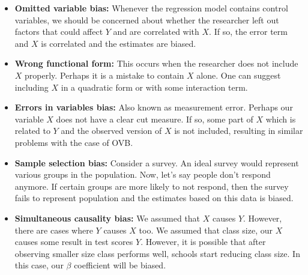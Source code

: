 \documentclass[12pt]{article}
\theoremstyle{definition}
\theoremstyle{property}
\theoremstyle{assumption}
\theoremstyle{example}
\theoremstyle{comment}
\begin{document}
\begin{itemize}
\item \textbf{Omitted variable bias: }Whenever the regression model contains control variables, we should be concerned about whether the researcher left out factors that could affect $Y$ and are correlated with $X$. If so, the error term and $X$ is correlated and the estimates are biased. 
\item \textbf{Wrong functional form: }This occurs when the researcher does not include $X$ properly. Perhaps it is a mistake to contain $X$ alone. One can suggest including $X$ in a quadratic form or with some interaction term.  
\item \textbf{Errors in variables bias: }Also known as measurement error. Perhaps our variable $X$ does not have a clear cut measure. If so, some part of $X$ which is related to $Y$ and the observed version of $X$ is not included, resulting in similar problems with the case of OVB.
\item \textbf{Sample selection bias: }Consider a survey. An ideal survey would represent various groups in the population. Now, let's say people don't respond anymore. If certain groups are more likely to not respond, then the survey fails to represent population and the estimates based on this data is biased.
\item \textbf{Simultaneous causality bias: }We assumed that $X$ causes $Y$. However, there are cases where $Y$ causes $X$ too.  We assumed that class size,  our $X$ causes some result in test scores $Y$. However, it is possible that after observing smaller size class performs well, schools start reducing class size. In this case, our $\beta$ coefficient will be biased. 
\end{itemize}
\end{document}
